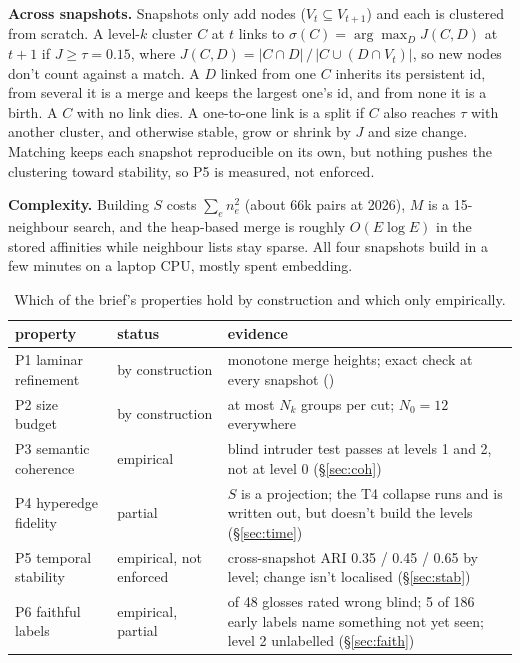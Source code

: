 \documentclass[10pt,a4paper]{article}
\newcommand{\code}[1]{\texttt{\small\detokenize{#1}}}
\newcommand{\para}[1]{\textbf{#1}\hspace{0.4em}}
\begin{document}
\para{Across snapshots.} Snapshots only add nodes ($V_t \subseteq V_{t+1}$) and each is clustered from
scratch. A level-$k$ cluster $C$ at $t$ links to $\sigma(C) = \arg\max_D J(C, D)$ at $t{+}1$ if
$J \ge \tau = 0.15$, where $J(C, D) = |C \cap D| \,/\, |C \cup (D \cap V_t)|$, so new nodes don't count
against a match. A $D$ linked from one $C$ inherits its persistent id, from several it is a merge and keeps
the largest one's id, and from none it is a birth. A $C$ with no link dies. A one-to-one link is a split if
$C$ also reaches $\tau$ with another cluster, and otherwise stable, grow or shrink by $J$ and size change.
Matching keeps each snapshot reproducible on its own, but nothing pushes the clustering toward
stability, so P5 is measured, not enforced.

\para{Complexity.} Building $S$ costs $\sum_e n_e^2$ (about 66k pairs at 2026), $M$ is a 15-neighbour
search, and the heap-based merge is roughly $O(E \log E)$ in the stored affinities while neighbour lists
stay sparse. All four snapshots build in a few minutes on a laptop CPU, mostly spent embedding.

\begin{table}[h]
\centering\small
\caption{Which of the brief's properties hold by construction and which only empirically.}
\label{tab:props}
\begin{tabularx}{\linewidth}{@{}l l >{\raggedright\arraybackslash}X@{}}
\toprule
property & status & evidence \\
\midrule
P1 laminar refinement & by construction & monotone merge heights; exact check at every snapshot (\code{validate_hierarchy.py}) \\
P2 size budget & by construction & at most $N_k$ groups per cut; $N_0 = 12$ everywhere \\
P3 semantic coherence & empirical & blind intruder test passes at levels 1 and 2, not at level 0 (§\ref{sec:coh}) \\
P4 hyperedge fidelity & partial & $S$ is a projection; the T4 collapse runs and is written out, but doesn't build the levels (§\ref{sec:time}) \\
P5 temporal stability & empirical, not enforced & cross-snapshot ARI 0.35 / 0.45 / 0.65 by level; change isn't localised (§\ref{sec:stab}) \\
P6 faithful labels & empirical, partial & 0 of 48 glosses rated wrong blind; 5 of 186 early labels name something not yet seen; level 2 unlabelled (§\ref{sec:faith}) \\
\bottomrule
\end{tabularx}
\end{table}
\end{document}
